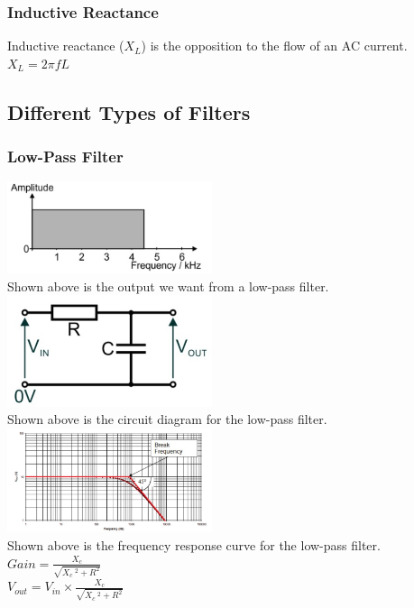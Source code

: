 \documentclass[a4paper,11pt, twocolumn]{article}
\begin{document}
\subsubsection{Inductive Reactance}
Inductive reactance ($X_L$) is the opposition to the flow of an AC current.\\
$\displaystyle X_L = 2 \pi f L$ 
\subsection{Different Types of Filters}
\subsubsection{Low-Pass Filter}
\includegraphics[width=0.45\textwidth]{lpfBasicGraph.jpg}\\
Shown above is the output we want from a low-pass filter.\\
\includegraphics[width=0.45\textwidth]{lpfCircuit.jpg}\\
Shown above is the circuit diagram for the low-pass filter.\\
\includegraphics[width=0.45\textwidth]{lpfFreqResp.jpg}\\
Shown above is the frequency response curve for the low-pass filter.\\
$\displaystyle Gain = \frac{X_c}{\sqrt{X_c\ ^2 + R^2}}$\\
$\displaystyle V_{out} = V_{in} \times \frac{X_c}{\sqrt{X_c\ ^2 + R^2}}$
\end{document}
